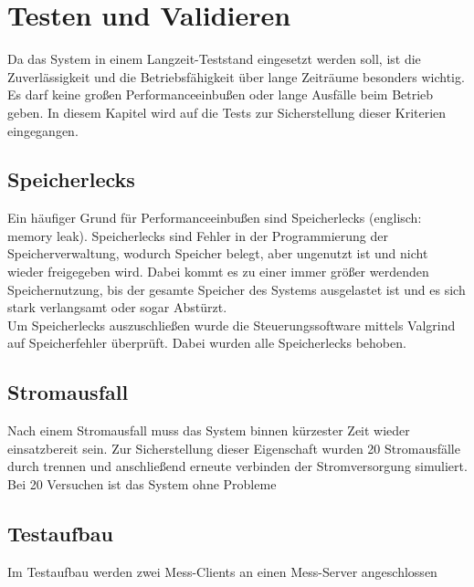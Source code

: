 
\chapter{Testen und Validieren}
\label{chapter_Testen_und_Validieren}

Da das System in einem Langzeit-Teststand eingesetzt werden soll, ist die Zuverlässigkeit und die Betriebsfähigkeit über lange Zeiträume besonders wichtig. Es darf keine großen Performanceeinbußen oder lange Ausfälle beim Betrieb geben. In diesem Kapitel wird auf die Tests zur Sicherstellung dieser Kriterien eingegangen.

\section{Speicherlecks}

Ein häufiger Grund für Performanceeinbußen sind Speicherlecks (englisch: memory leak). Speicherlecks sind Fehler in der Programmierung der Speicherverwaltung, wodurch Speicher belegt, aber ungenutzt ist und nicht wieder freigegeben wird. Dabei kommt es zu einer immer größer werdenden Speichernutzung, bis der gesamte Speicher des Systems ausgelastet ist und es sich stark verlangsamt oder sogar Abstürzt.\\
Um Speicherlecks auszuschließen wurde die Steuerungssoftware mittels Valgrind \cite{valgrind} auf Speicherfehler überprüft. Dabei wurden alle Speicherlecks behoben.\\

\section{Stromausfall}

Nach einem Stromausfall muss das System binnen kürzester Zeit wieder einsatzbereit sein. Zur Sicherstellung dieser Eigenschaft wurden 20 Stromausfälle durch trennen und anschließend erneute verbinden der Stromversorgung simuliert.\\
Bei 20 Versuchen ist das System ohne Probleme 

\section{Testaufbau}

Im Testaufbau werden zwei Mess-Clients an einen Mess-Server angeschlossen
